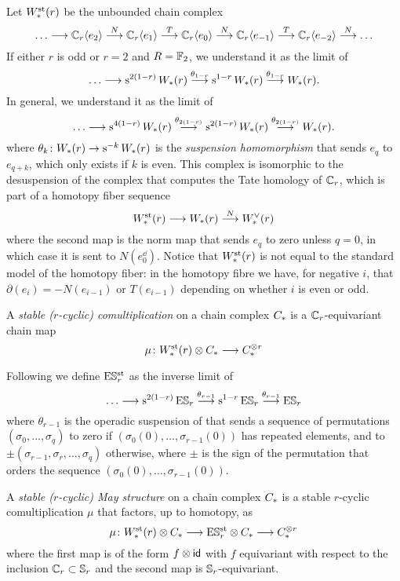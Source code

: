 Let $W^{\mathrm{st}}_{*}(r)$ be the unbounded chain complex
\[
\ldots\longrightarrow \mathbb{C}_r\langle e_2\rangle \overset{N}{\longrightarrow}
\mathbb{C}_r\langle e_1\rangle \overset{T}{\longrightarrow}
\mathbb{C}_r\langle e_0\rangle \overset{N}{\longrightarrow}
\mathbb{C}_r\langle e_{-1}\rangle \overset{T}{\longrightarrow}
\mathbb{C}_r\langle e_{-2}\rangle \overset{N}{\longrightarrow}
\ldots
\]
If either $r$ is odd or $r=2$ and $R=\mathbb{F}_2$, we understand it as the limit of
\[
\ldots\longrightarrow \operatorname{s}^{2(1-r)}W_{*}(r)\overset{\theta_{1-r}}{\longrightarrow} \operatorname{s}^{1-r} W_{*}(r) \overset{\theta_{1-r}}{\longrightarrow} W_{*}(r).
\]
In general, we understand it as the limit of
\[
\ldots\longrightarrow \operatorname{s}^{4(1-r)}W_{*}(r)\overset{\theta_{2(1-r)}}{\longrightarrow} \operatorname{s}^{2(1-r)} W_{*}(r) \overset{\theta_{2(1-r)}}{\longrightarrow} W_{*}(r).
\]
where $\theta_{k}\colon W_{*}(r)\to \operatorname{s}^{-k} W_{*}(r)$ is the \emph{suspension homomorphism} that sends $e_{q}$ to $e_{q+k}$, which only exists if $k$ is even. %
 This complex is isomorphic to the desuspension of the complex that computes the Tate homology of $\mathbb{C}_r$, which is part of a homotopy fiber sequence
\[
	W^{\mathrm{st}}_{*}(r)\longrightarrow W_{*}(r)\overset{N}{\longrightarrow} W^\vee_{*}(r)
\]
where the second map is the norm map that sends $e_q$ to zero unless $q=0$, in which case it is sent to $N(e_0^\dd)$. Notice that $W^{\mathrm{st}}_{*}(r)$ is not equal to the standard model of the homotopy fiber: in the homotopy fibre we have, for negative $i$, that $\partial(e_i) = -N(e_{i-1})$ or $T(e_{i-1})$ depending on whether $i$ is even or odd.



\begin{definition} A \emph{stable ($r$-cyclic) comultiplication} on a chain complex $C_{*}$ is a $\mathbb{C}_r$-equivariant chain map
\[
\mu\colon W^{\mathrm{st}}_{*}(r)\otimes C_{*}\longrightarrow C_{*}^{\otimes r}
\]
\end{definition}

Following \cite{Gill2020} we define $\mathrm{E}\mathbb{S}^{\mathrm{st}}_r$ as the inverse limit of
\[
	\ldots \longrightarrow \operatorname{s}^{2(1-r)} \mathrm{E}\mathbb{S}_r\overset{\theta_{r-1}}{\longrightarrow }\operatorname{s}^{1-r} \mathrm{E}\mathbb{S}_r\overset{\theta_{r-1}}{\longrightarrow} \mathrm{E}\mathbb{S}_r
\]
where $\theta_{r-1}$ is the operadic suspension of \cite{berger2004combinatorial} that sends a sequence of permutations $(\sigma_0,\ldots,\sigma_q)$ to zero if $(\sigma_0(0),\ldots,\sigma_{r-1}(0))$ has repeated elements, and to $\pm (\sigma_{r-1},\sigma_r,\ldots,\sigma_q)$ otherwise, where $\pm$ is the sign of the permutation that orders the sequence $(\sigma_0(0),\ldots,\sigma_{r-1}(0))$.

\begin{definition} A \emph{stable ($r$-cyclic) May structure} on a chain complex $C_{*}$ is a stable $r$-cyclic comultiplication $\mu$ that factors, up to homotopy, as
\[
\mu\colon W^{\mathrm{st}}_{*}(r)\otimes C_{*}\longrightarrow \mathrm{E}\mathbb{S}^{\mathrm{st}}_r\otimes C_{*}\longrightarrow  C_{*}^{\otimes r}
\]
where the first map is of the form $f\otimes \mathsf{id}$ with $f$ equivariant with respect to the inclusion $\mathbb{C}_r\subset \mathbb{S}_r$ and the second map is $\mathbb{S}_r$-equivariant.
\end{definition}

